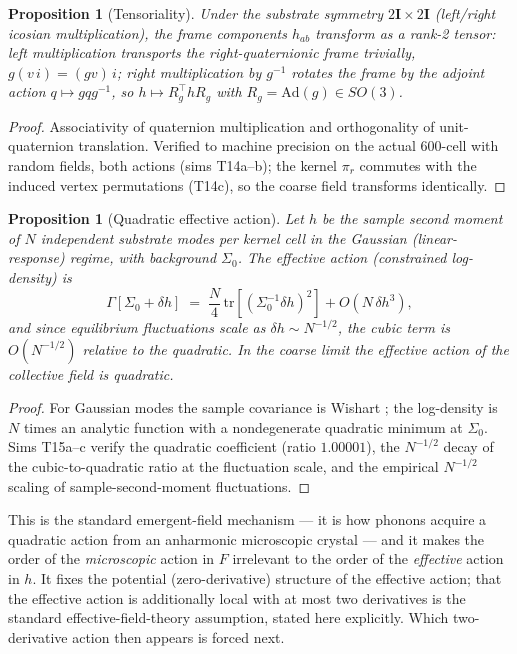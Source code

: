 \documentclass[12pt]{article}
\newtheorem{proposition}[theorem]{Proposition}
\theoremstyle{definition}
\theoremstyle{remark}
\newcommand{\twoI}{2\mathbf{I}}
\begin{document}
\begin{proposition}[Tensoriality]\label{prop:tensorial}
Under the substrate symmetry $\twoI \times \twoI$ (left/right icosian multiplication), the frame components $h_{ab}$ transform as a rank-2 tensor: left multiplication transports the right-quaternionic frame trivially, $g(v\,i) = (gv)\,i$; right multiplication by $g^{-1}$ rotates the frame by the adjoint action $q \mapsto g q g^{-1}$, so $h \mapsto R_g^{\top} h R_g$ with $R_g = \mathrm{Ad}(g) \in SO(3)$.
\end{proposition}

\begin{proof}
Associativity of quaternion multiplication and orthogonality of unit-quaternion translation. Verified to machine precision on the actual 600-cell with random fields, both actions (sims T14a--b); the kernel $\pi_r$ commutes with the induced vertex permutations (T14c), so the coarse field transforms identically.
\end{proof}

\begin{proposition}[Quadratic effective action]\label{prop:wishart}
Let $h$ be the sample second moment of $N$ independent substrate modes per kernel cell in the Gaussian (linear-response) regime, with background $\Sigma_0$. The effective action (constrained log-density) is
\begin{equation}
\Gamma[\Sigma_0 + \delta h] \;=\; \frac{N}{4}\,\mathrm{tr}\!\left[(\Sigma_0^{-1}\delta h)^2\right] + O\!\left(N\,\delta h^3\right),
\end{equation}
and since equilibrium fluctuations scale as $\delta h \sim N^{-1/2}$, the cubic term is $O(N^{-1/2})$ relative to the quadratic. In the coarse limit the effective action of the collective field is quadratic.
\end{proposition}

\begin{proof}
For Gaussian modes the sample covariance is Wishart \citep{Wishart1928}; the log-density is $N$ times an analytic function with a nondegenerate quadratic minimum at $\Sigma_0$. Sims T15a--c verify the quadratic coefficient (ratio $1.00001$), the $N^{-1/2}$ decay of the cubic-to-quadratic ratio at the fluctuation scale, and the empirical $N^{-1/2}$ scaling of sample-second-moment fluctuations.
\end{proof}

This is the standard emergent-field mechanism --- it is how phonons acquire a quadratic action from an anharmonic microscopic crystal --- and it makes the order of the \emph{microscopic} action in $F$ irrelevant to the order of the \emph{effective} action in $h$. It fixes the potential (zero-derivative) structure of the effective action; that the effective action is additionally local with at most two derivatives is the standard effective-field-theory assumption, stated here explicitly. Which two-derivative action then appears is forced next.
\end{document}
